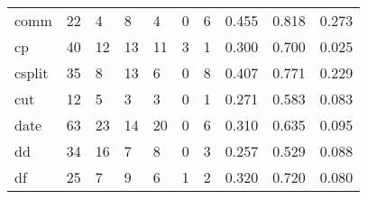 \begin{longtable}{lp{2.0cm}p{2.0cm}p{2.0cm}p{2.0cm}p{2.0cm}p{2.0cm}p{2.0cm}p{2.0cm}p{2.0cm}}
comm      &                     22 &                                             4 &                                            8 &                                           4 &                                            0 &                                          6 &                                0.455 &                                  0.818 &                                0.273 \\
cp        &                     40 &                                            12 &                                           13 &                                          11 &                                            3 &                                          1 &                                0.300 &                                  0.700 &                                0.025 \\
csplit    &                     35 &                                             8 &                                           13 &                                           6 &                                            0 &                                          8 &                                0.407 &                                  0.771 &                                0.229 \\
cut       &                     12 &                                             5 &                                            3 &                                           3 &                                            0 &                                          1 &                                0.271 &                                  0.583 &                                0.083 \\
date      &                     63 &                                            23 &                                           14 &                                          20 &                                            0 &                                          6 &                                0.310 &                                  0.635 &                                0.095 \\
dd        &                     34 &                                            16 &                                            7 &                                           8 &                                            0 &                                          3 &                                0.257 &                                  0.529 &                                0.088 \\
df        &                     25 &                                             7 &                                            9 &                                           6 &                                            1 &                                          2 &                                0.320 &                                  0.720 &                                0.080 \\

\end{longtable}
